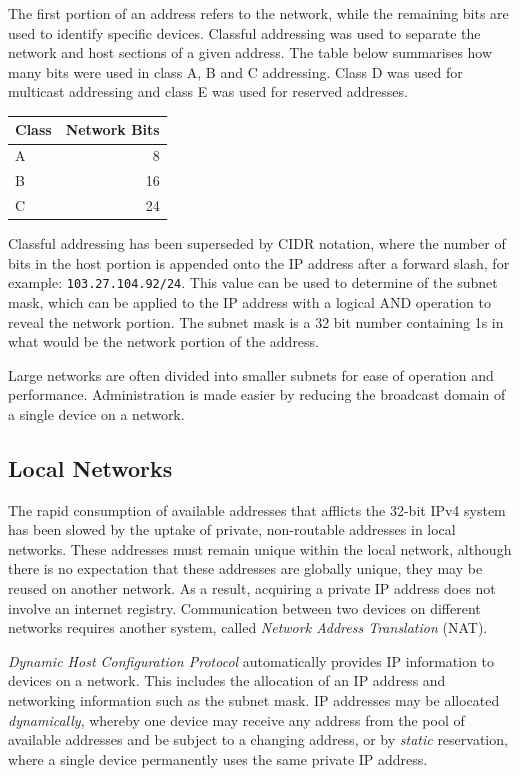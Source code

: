 \documentclass[9pt]{article}
\begin{document}
The first portion of an address refers to the network, while the remaining bits are used to identify specific devices. Classful addressing was used to separate the network and host sections of a given address. The table below summarises how many bits were used in class A, B and C addressing. Class D was used for multicast addressing and class E was used for reserved addresses.

\begin{center}
\begin{tabular}{lr}
\hline
Class & Network Bits\\
\hline
A & 8\\
B & 16\\
C & 24\\
\hline
\end{tabular}
\end{center}

Classful addressing has been superseded by CIDR notation, where the number of bits in the host portion is appended onto the IP address after a forward slash, for example: \texttt{103.27.104.92/24}. This value can be used to determine of the subnet mask, which can be applied to the IP address with a logical AND operation to reveal the network portion. The subnet mask is a 32 bit number containing 1s in what would be the network portion of the address.

Large networks are often divided into smaller subnets for ease of operation and performance. Administration is made easier by reducing the broadcast domain of a single device on a network.

\subsection{Local Networks}
\label{sec:orgd350329}

The rapid consumption of available addresses that afflicts the 32-bit IPv4 system has been slowed by the uptake of private, non-routable addresses in local networks. These addresses must remain unique within the local network, although there is no expectation that these addresses are globally unique, they may be reused on another network. As a result, acquiring a private IP address does not involve an internet registry. Communication between two devices on different networks requires another system, called \emph{Network Address Translation} (NAT).

\emph{Dynamic Host Configuration Protocol} automatically provides IP information to devices on a network. This includes the allocation of an IP address and networking information such as the subnet mask. IP addresses may be allocated \emph{dynamically}, whereby one device may receive any address from the pool of available addresses and be subject to a changing address, or by \emph{static} reservation, where a single device permanently uses the same private IP address.
\end{document}

